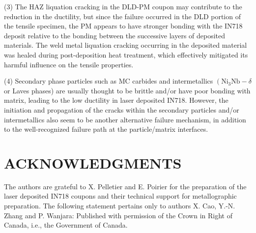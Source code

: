 \documentclass[10pt]{article}
\begin{document}
(3) The HAZ liquation cracking in the DLD-PM coupon may contribute to the reduction in the ductility, but since the failure occurred in the DLD portion of the tensile specimen, the PM appears to have stronger bonding with the IN718 deposit relative to the bonding between the successive layers of deposited materials. The weld metal liquation cracking occurring in the deposited material was healed during post-deposition heat treatment, which effectively mitigated its harmful influence on the tensile properties.

(4) Secondary phase particles such as MC carbides and intermetallics $\left(\mathrm{Ni}_{3} \mathrm{Nb}-\delta\right.$ or Laves phases) are usually thought to be brittle and/or have poor bonding with matrix, leading to the low ductility in laser deposited IN718. However, the initiation and propagation of the cracks within the secondary particles and/or intermetallics also seem to be another alternative failure mechanism, in addition to the well-recognized failure path at the particle/matrix interfaces.

\section*{ACKNOWLEDGMENTS}
The authors are grateful to X. Pelletier and E. Poirier for the preparation of the laser deposited IN718 coupons and their technical support for metallographic preparation. The following statement pertains only to authors X. Cao, Y.-N. Zhang and P. Wanjara: Published with permission of the Crown in Right of Canada, i.e., the Government of Canada.
\end{document}
